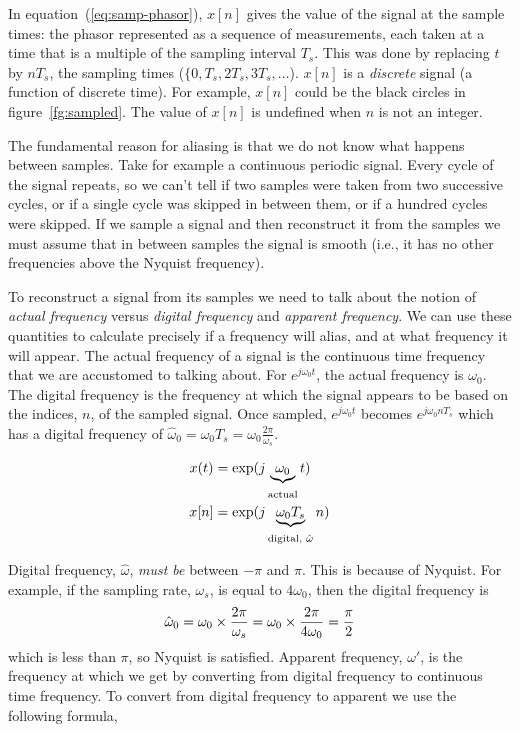 In equation~(\ref{eq:samp-phasor}), $x[n]$ gives the value of the signal at the
sample times: the phasor represented as a sequence of measurements,
each taken at a time that is a multiple of the sampling interval
$T_s$. This was done by replacing $t$ by $nT_s$, the sampling times
($\{0, T_s, 2T_s, 3T_s, \ldots$). $x[n]$ is a \emph{discrete} signal
(a function of discrete time). For example, $x[n]$ could be the black circles in
figure~\ref{fg:sampled}. The value of $x[n]$ is undefined when $n$ is not an integer. 

The fundamental reason for aliasing is that we do not know what happens between samples. Take for example a continuous periodic signal. Every cycle of the signal repeats, so we can't tell if two
samples were taken from two successive cycles, or if a single cycle
was skipped in between them, or if a hundred cycles were
skipped. If we sample a signal and then reconstruct it from the samples we must assume that in between samples the signal is smooth (i.e., it has no other frequencies above the Nyquist frequency). 

To reconstruct a signal from its samples we need to talk about the notion of \emph{actual frequency} versus \emph{digital frequency} and \emph{apparent frequency}. We can use these quantities to calculate precisely if a frequency will alias, and at what frequency it will appear. The actual frequency of a signal is the continuous time frequency that we are accustomed to talking about. For  $e^{j\omega_0 t}$, the actual frequency is $\omega_0$. The digital frequency is the frequency at which the signal appears to be based on the indices, $n$, of the sampled signal. Once sampled, $ e^{j\omega_0 t}$ becomes $ e^{j\omega_0 nT_s}$ which has a digital frequency of $\hat{\omega}_0=\omega_0 T_s=\omega_0 \frac{2\pi}{\omega_s}$.  

\begin{align}
x(t) & = \exp(j\underbrace{\omega_0}_{\stackrel{}{\text{actual}}}t) \notag\\
x[n] & = \exp(j\underbrace{\omega_0 T_s}_{\stackrel{}{\text{digital, $\hat{\omega}$}}} n) \label{eq:samp-phasor-nyq}
\end{align}

Digital frequency, $\hat{\omega}$, \emph{must be} between $-\pi$ and $\pi$. This is because of Nyquist. For example, if the sampling rate, $\omega_s$, is equal to $4\omega_0$, then the digital frequency is
 \[
 \hat{\omega}_0=\omega_0 \times  \frac{2\pi}{\omega_s}=\omega_0\times \frac{2\pi}{4\omega_0}=\frac{\pi}{2} \notag 
 \]
which is less than $\pi$, so Nyquist is satisfied. Apparent frequency, $\omega'$, is the frequency at which we get by converting from digital frequency to continuous time frequency. To convert from digital frequency to apparent we use the following formula,

